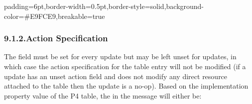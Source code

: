 \documentclass[11pt]{article}
\begin{document}
{%
\begin{mdbmargintb}{6pt}{6pt}%
\begin{mdblock}{padding=6pt,border-width=0.5pt,border-style=solid,background-color=\#E9FCE9,breakable=true}%
\begin{mdpre}%
\end{mdpre}%
\end{mdblock}%
\end{mdbmargintb}%

\subsubsection{9.1.2.\hspace*{0.5em}Action Specification}\label{sec-action-specification}%

\noindent{}The   field must be set for every  update but may be
left unset for  updates, in which case the action specification for the
table entry will not be modified (if a  update has an unset action field
and does not modify any direct resource attached to the table then the 
update is a no-op). Based on the implementation property value of the P4 table,
the  in the  message will either be:%

}
\end{document}
